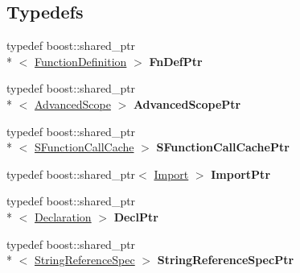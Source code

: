 \subsection*{Typedefs}
\begin{DoxyCompactItemize}
\item 
\hypertarget{namespacegiskard__suturo_a5f19e8581a018be9b556a251adb50982}{typedef boost\-::shared\-\_\-ptr\\*
$<$ \hyperlink{classgiskard__suturo_1_1FunctionDefinition}{Function\-Definition} $>$ {\bfseries Fn\-Def\-Ptr}}\label{namespacegiskard__suturo_a5f19e8581a018be9b556a251adb50982}

\item 
\hypertarget{namespacegiskard__suturo_a86a8ec67ebaf603020787bdd0585883b}{typedef boost\-::shared\-\_\-ptr\\*
$<$ \hyperlink{classgiskard__suturo_1_1AdvancedScope}{Advanced\-Scope} $>$ {\bfseries Advanced\-Scope\-Ptr}}\label{namespacegiskard__suturo_a86a8ec67ebaf603020787bdd0585883b}

\item 
\hypertarget{namespacegiskard__suturo_a14bfbe9a82d967caea464b79ea48226e}{typedef boost\-::shared\-\_\-ptr\\*
$<$ \hyperlink{structgiskard__suturo_1_1SFunctionCallCache}{S\-Function\-Call\-Cache} $>$ {\bfseries S\-Function\-Call\-Cache\-Ptr}}\label{namespacegiskard__suturo_a14bfbe9a82d967caea464b79ea48226e}

\item 
\hypertarget{namespacegiskard__suturo_aa55fa1a8521abc11dd02cab1bd1cd505}{typedef boost\-::shared\-\_\-ptr$<$ \hyperlink{structgiskard__suturo_1_1Import}{Import} $>$ {\bfseries Import\-Ptr}}\label{namespacegiskard__suturo_aa55fa1a8521abc11dd02cab1bd1cd505}

\item 
\hypertarget{namespacegiskard__suturo_ab1daa94bb3ead076fac7a41ec7941281}{typedef boost\-::shared\-\_\-ptr\\*
$<$ \hyperlink{structgiskard__suturo_1_1Declaration}{Declaration} $>$ {\bfseries Decl\-Ptr}}\label{namespacegiskard__suturo_ab1daa94bb3ead076fac7a41ec7941281}

\item 
\hypertarget{namespacegiskard__suturo_a2324b64921fd4a6d7c2869b2af2a7540}{typedef boost\-::shared\-\_\-ptr\\*
$<$ \hyperlink{classgiskard__suturo_1_1StringReferenceSpec}{String\-Reference\-Spec} $>$ {\bfseries String\-Reference\-Spec\-Ptr}}\label{namespacegiskard__suturo_a2324b64921fd4a6d7c2869b2af2a7540}


\end{DoxyCompactItemize}
